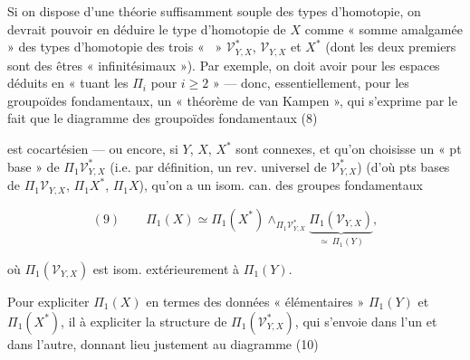 \documentclass[11pt,a4paper]{article}
\begin{document}
Si on dispose d'une théorie suffisamment souple des types d'homotopie, on
devrait pouvoir en déduire le type d'homotopie de $X$ comme « somme
amalgamée » des types d'homotopie des trois  « \ill\ »
$\mathcal{V}^{*}_{Y,X}$, $\mathcal{V}_{Y,X}$ et $X^{*}$ (dont les deux premiers
sont des êtres « infinitésimaux »). Par exemple, on doit avoir pour les espaces
déduits en « tuant les $\Pi_i$ pour $i \geq 2$ » — donc, essentiellement, pour
les groupoïdes fondamentaux, un « théorème de van Kampen », qui s'exprime par
le fait que le diagramme des groupoïdes fondamentaux (8)




est cocartésien — ou encore, si $Y$, $X$, $X^{*}$ sont connexes, et qu'on
choisisse un « pt base » de $\Pi_1\mathcal{V}^{*}_{Y,X}$ (i.e. par définition,
un rev. universel de $\mathcal{V}^{*}_{Y,X}$) (d'où pts bases de
$\Pi_1\mathcal{V}_{Y,X}$, $\Pi_1 X^{*}$, $\Pi_1 X$), qu'on a un isom. can. des
groupes fondamentaux

\[
  (9) \qquad \Pi_1(X) \simeq \Pi_1(X^{*})
    \wedge_{\Pi_1\mathcal{V}^{*}_{Y,X}}
    \underbrace{\Pi_1(\mathcal{V}_{Y,X})}_{\simeq\ \Pi_1(Y)} ,
\]

où $\Pi_1(\mathcal{V}_{Y,X})$ est isom. extérieurement à $\Pi_1(Y)$.

Pour expliciter $\Pi_1(X)$ en termes des données « élémentaires » $\Pi_1(Y)$ et
$\Pi_1(X^{*})$, il   à expliciter la
structure de $\Pi_1(\mathcal{V}^{*}_{Y,X})$, qui s'envoie dans l'un et dans
l'autre, donnant lieu justement au diagramme (10)

\end{document}
